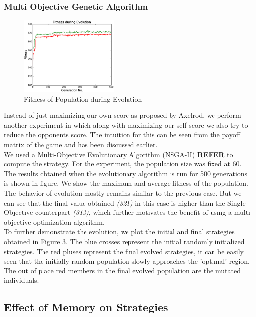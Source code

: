 \documentclass[a4paper]{article}
\begin{document}
	\subsubsection{Multi Objective Genetic Algorithm}
		
	\begin{figure}
	\centering
	\includegraphics[width=0.43\textwidth]{multFitPlot.eps}
	\caption{\footnotesize{Fitness of Population during Evolution}}
	\end{figure}
	
	Instead of just maximizing our own score as proposed by Axelrod, we perform another experiment in which along with maximizing our self score we also try to reduce the opponents score. The intuition for this can be seen from the payoff matrix of the game and has been discussed earlier.\\
	We used a Multi-Objective Evolutionary Algorithm (NSGA-II) \textbf{REFER} to compute the strategy. For the experiment, the population size was fixed at 60. The results obtained when the evolutionary algorithm is run for 500 generations is shown in figure. We show the maximum and average fitness of the population. The behavior of evolution mostly remains similar to the previous case. But we can see that the final value obtained \textit{(321)} in this case is higher than the Single Objective counterpart \textit{(312)}, which further motivates the benefit of using a multi-objective optimization algorithm.\\

	To further demonstrate the evolution, we plot the initial and final strategies obtained in Figure 3. The blue crosses represent the initial randomly initialized strategies. The red pluses represent the final evolved strategies, it can be easily seen that the initially random population slowly approaches the 'optimal' region. The out of place red members in the final evolved population are the mutated individuals.
	
	\subsection{Effect of Memory on Strategies}
	
\end{document}
